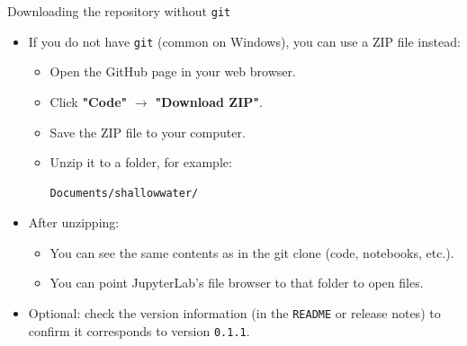 \documentclass[]{beamer}
\begin{document}
\begin{frame}[fragile,shrink=8]{Downloading the repository without \texttt{git}}
\begin{itemize}
  \item If you do not have \texttt{git} (common on Windows), you can use a ZIP file instead:
    \begin{itemize}
      \item Open the GitHub page in your web browser.
      \item Click \textbf{"Code"} $\rightarrow$ \textbf{"Download ZIP"}.
      \item Save the ZIP file to your computer.
      \item Unzip it to a folder, for example:
\begin{verbatim}
Documents/shallowwater/
\end{verbatim}
    \end{itemize}

  \item After unzipping:
    \begin{itemize}
      \item You can see the same contents as in the git clone
            (code, notebooks, etc.).
      \item You can point JupyterLab’s file browser to that folder to open files.
    \end{itemize}

  \item Optional: check the version information (in the \texttt{README} or
        release notes) to confirm it corresponds to version \texttt{0.1.1}.
\end{itemize}
\end{frame}
\end{document}
